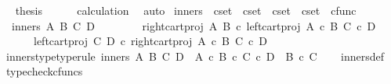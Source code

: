 \begin{isabellebody}
\ \isamarkupfalse%
\ {\isacharquery}{\kern0pt}thesis\isanewline
\ \ \ \ \isamarkupfalse%
\ calculation\ \isamarkupfalse%
\ auto\isanewline
{}\isamarkupfalse%
%
\endisatagproof
{\isafoldproof}%
%
\isadelimproof
\isanewline
%
\endisadelimproof
\isanewline
{}\isamarkupfalse%
\ inners\ {\isacharcolon}{\kern0pt}{\isacharcolon}{\kern0pt}\ {\isachardoublequoteopen}cset\ {\isasymRightarrow}\ cset\ {\isasymRightarrow}\ cset\ {\isasymRightarrow}\ cset\ {\isasymRightarrow}\ cfunc{\isachardoublequoteclose}\ \isanewline
\ \ {\isachardoublequoteopen}inners\ A\ B\ C\ D\ {\isacharequal}{\kern0pt}\ {\isasymlangle}\isanewline
\ \ \ \ \ \ right{\isacharunderscore}{\kern0pt}cart{\isacharunderscore}{\kern0pt}proj\ A\ B\ {\isasymcirc}\isactrlsub c\ left{\isacharunderscore}{\kern0pt}cart{\isacharunderscore}{\kern0pt}proj\ {\isacharparenleft}{\kern0pt}A\ {\isasymtimes}\isactrlsub c\ B{\isacharparenright}{\kern0pt}\ {\isacharparenleft}{\kern0pt}C\ {\isasymtimes}\isactrlsub c\ D{\isacharparenright}{\kern0pt}{\isacharcomma}{\kern0pt}\isanewline
\ \ \ \ \ \ left{\isacharunderscore}{\kern0pt}cart{\isacharunderscore}{\kern0pt}proj\ C\ D\ {\isasymcirc}\isactrlsub c\ right{\isacharunderscore}{\kern0pt}cart{\isacharunderscore}{\kern0pt}proj\ {\isacharparenleft}{\kern0pt}A\ {\isasymtimes}\isactrlsub c\ B{\isacharparenright}{\kern0pt}\ {\isacharparenleft}{\kern0pt}C\ {\isasymtimes}\isactrlsub c\ D{\isacharparenright}{\kern0pt}\isanewline
\ \ \ \ {\isasymrangle}{\isachardoublequoteclose}\isanewline
\isanewline
{}\isamarkupfalse%
\ inners{\isacharunderscore}{\kern0pt}type{\isacharbrackleft}{\kern0pt}type{\isacharunderscore}{\kern0pt}rule{\isacharbrackright}{\kern0pt}{\isacharcolon}{\kern0pt}\ {\isachardoublequoteopen}inners\ A\ B\ C\ D\ {\isacharcolon}{\kern0pt}\ {\isacharparenleft}{\kern0pt}A\ {\isasymtimes}\isactrlsub c\ B{\isacharparenright}{\kern0pt}\ {\isasymtimes}\isactrlsub c\ {\isacharparenleft}{\kern0pt}C\ {\isasymtimes}\isactrlsub c\ D{\isacharparenright}{\kern0pt}\ {\isasymrightarrow}\ {\isacharparenleft}{\kern0pt}B\ {\isasymtimes}\isactrlsub c\ C{\isacharparenright}{\kern0pt}{\isachardoublequoteclose}\isanewline
%
\isadelimproof
\ \ %
\endisadelimproof
%
\isatagproof
{}\isamarkupfalse%
\ inners{\isacharunderscore}{\kern0pt}def\ \isamarkupfalse%
\ typecheck{\isacharunderscore}{\kern0pt}cfuncs%
\endisatagproof
{\isafoldproof}%
%
\isadelimproof
\isanewline
%
\endisadelimproof
\ \ \ \ \isanewline
{}\isamarkupfalse%

\end{isabellebody}
